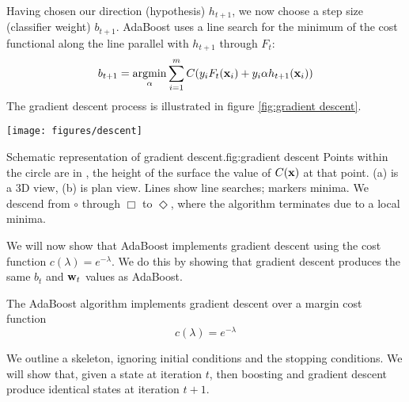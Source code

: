 Having chosen our direction (hypothesis) $h_{t+1}$, we now choose a step
size (classifier weight) $b_{t+1}$.  AdaBoost uses a line search for the
minimum of the cost functional along the line parallel with $h_{t+1}$
through $F_t$:
%
\begin{equation}
b_{t+1} = \argmin_{\alpha} \sum_{i=1}^{m} C(y_i F_t(\bfx_i) + y_i \alpha
h_{t+1}(\bfx_i))
\end{equation}
%
The gradient descent process is illustrated in figure
\ref{fig:gradient descent}.

\begin{linefigure}
\begin{center}
\texttt{[image: figures/descent]}
\end{center}
\begin{capt}{Schematic representation of gradient
descent.}{fig:gradient descent}
Points within the circle are in \calH, the height of the surface
the value of $C(\mathbf{x})$ at that point.  (a) is a 3D view, (b) is plan
view. Lines show line searches; markers minima.  We descend from
$\circ$ through $\Box$ to $\Diamond$, where the algorithm terminates
due to a local minima.
\end{capt}
\end{linefigure}

We will now show that AdaBoost implements gradient descent using the
cost function $c(\lambda) = e^{-\lambda}$.  We do this by showing that
gradient descent produces the same $b_t$ and $\mathbf{w}_t$ values as
AdaBoost.

\begin{theorem}
\label{thm:adaboost gradient descent}
The AdaBoost algorithm implements gradient descent over a margin cost
function
%
\begin{equation}
\label{eqn:adaboost margin cost function}
c(\lambda) = e^{-\lambda}
\end{equation}
\end{theorem}

\proof We outline a skeleton, ignoring initial conditions and the
stopping conditions.  We will show that, given a state at iteration
$t$, then boosting and gradient descent produce identical states at
iteration $t+1$.

